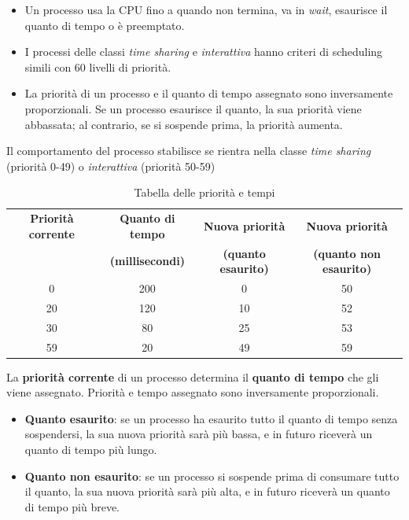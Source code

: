 \begin{itemize}
    \item Un processo usa la CPU fino a quando non termina, va in \textit{wait}, esaurisce il quanto di tempo o è preemptato.
    \item I processi delle classi \textit{time sharing} e \textit{interattiva} hanno criteri di scheduling simili con 60 livelli di priorità.
    \item La priorità di un processo e il quanto di tempo assegnato sono inversamente proporzionali. Se un processo esaurisce il quanto, la sua priorità viene abbassata; al contrario, se si sospende prima, la priorità aumenta.
\end{itemize}

Il comportamento del processo stabilisce se rientra nella classe \textit{time sharing} (priorità 0-49) o \textit{interattiva} (priorità 50-59)
\begin{table}[h]
    \centering
    \begin{tabular}{|c|c|c|c|}
    \hline
    \rowcolor{gray} \textbf{Priorità corrente} & \textbf{Quanto di tempo} & \textbf{Nuova priorità} & \textbf{Nuova priorità} \\
    \rowcolor{gray} & \textbf{(millisecondi)} & \textbf{(quanto esaurito)} & \textbf{(quanto non esaurito)} \\
    \hline
    0 & 200 & 0 & 50 \\
    \hline
    20 & 120 & 10 & 52 \\
    \hline
    30 & 80 & 25 & 53 \\
    \hline
    59 & 20 & 49 & 59 \\
    \hline
    \end{tabular}
    \caption{Tabella delle priorità e tempi}
    \label{tab:pri_tempi}
\end{table}

La \textbf{priorità corrente} di un processo determina il \textbf{quanto di tempo} che gli viene assegnato. Priorità e tempo assegnato sono inversamente proporzionali.

\begin{itemize}
    \item \textbf{Quanto esaurito}: se un processo ha esaurito tutto il quanto di tempo senza sospendersi, la sua nuova priorità sarà più bassa, e in futuro riceverà un quanto di tempo più lungo.
    \item \textbf{Quanto non esaurito}: se un processo si sospende prima di consumare tutto il quanto, la sua nuova priorità sarà più alta, e in futuro riceverà un quanto di tempo più breve.
\end{itemize}


